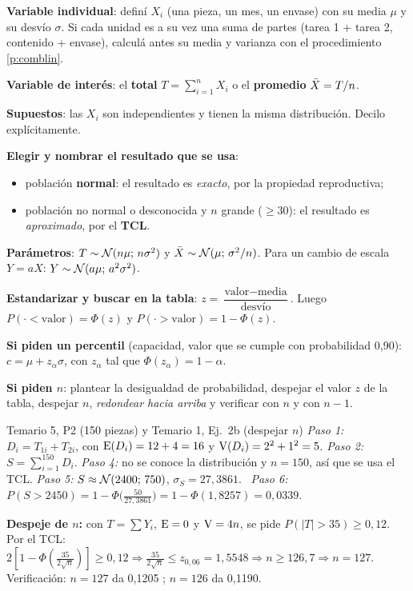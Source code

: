 \begin{pasos}
\begin{pasolista}
\item \textbf{Variable individual}: definí $X_i$ (una pieza, un mes, un envase) con su media $\mu$ y su desvío $\sigma$. Si cada unidad es a su vez una suma de partes (tarea 1 + tarea 2, contenido + envase), calculá antes su media y varianza con el procedimiento \ref{p:comblin}.
\item \textbf{Variable de interés}: el \textbf{total} $T=\sum_{i=1}^nX_i$ o el \textbf{promedio} $\bar{X}=T/n$.
\item \textbf{Supuestos}: las $X_i$ son independientes y tienen la misma distribución. Decilo explícitamente.
\item \textbf{Elegir y nombrar el resultado que se usa}:
\begin{itemize}
\item población \textbf{normal}: el resultado es \emph{exacto}, por la propiedad reproductiva;
\item población no normal o desconocida y $n$ grande ($\ge30$): el resultado es \emph{aproximado}, por el \textbf{TCL}.
\end{itemize}
\item \textbf{Parámetros}: $T\sim\mathcal{N}(n\mu;\,n\sigma^2)$ y $\bar{X}\sim\mathcal{N}(\mu;\,\sigma^2/n)$. Para un cambio de escala $Y=aX$: $Y\sim\mathcal{N}(a\mu;\,a^2\sigma^2)$.
\item \textbf{Estandarizar y buscar en la tabla}: $z=\dfrac{\text{valor}-\text{media}}{\text{desvío}}$. Luego $P(\cdot<\text{valor})=\Phi(z)$ y $P(\cdot>\text{valor})=1-\Phi(z)$.
\item \textbf{Si piden un percentil} (capacidad, valor que se cumple con probabilidad 0,90): $c=\mu+z_\alpha\sigma$, con $z_\alpha$ tal que $\Phi(z_\alpha)=1-\alpha$.
\item \textbf{Si piden $n$}: plantear la desigualdad de probabilidad, despejar el valor $z$ de la tabla, despejar $n$, \emph{redondear hacia arriba} y verificar con $n$ y con $n-1$.
\end{pasolista}
\end{pasos}
\begin{modelo}{Temario 5, P2 (150 piezas) y Temario 1, Ej.\ 2b (despejar $n$)}
\emph{Paso 1:} $D_i=T_{1i}+T_{2i}$, con $\mathrm{E}(D_i)=12+4=16$ y $\mathrm{V}(D_i)=2^2+1^2=5$. \emph{Paso 2:} $S=\sum_{i=1}^{150}D_i$. \emph{Paso 4:} no se conoce la distribución y $n=150$, así que se usa el TCL.
\emph{Paso 5:} $S\approx\mathcal{N}(2400;\,750)$, $\sigma_S=27{,}3861$. \ \emph{Paso 6:} $P(S>2450)=1-\Phi\big(\frac{50}{27{,}3861}\big)=1-\Phi(1{,}8257)=0{,}0339$.

\textbf{Despeje de $n$:} con $T=\sum Y_i$, $\mathrm{E}=0$ y $\mathrm{V}=4n$, se pide $P(|T|>35)\ge0{,}12$. Por el TCL: $2[1-\Phi(\frac{35}{2\sqrt n})]\ge0{,}12\Rightarrow\frac{35}{2\sqrt n}\le z_{0,06}=1{,}5548\Rightarrow n\ge126{,}7\Rightarrow n=127$. Verificación: $n=127$ da 0,1205 \checkmark; $n=126$ da 0,1190.
\end{modelo}
